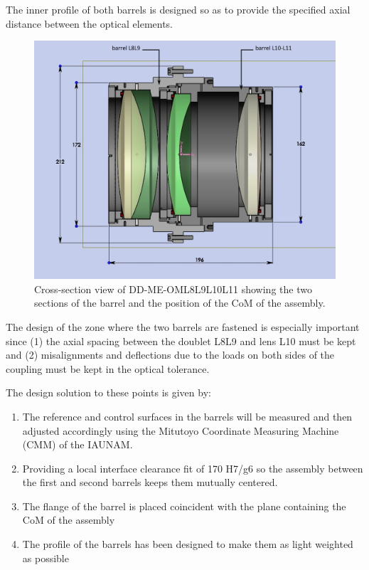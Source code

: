 \documentclass{report}
\begin{document}
The inner profile of both barrels is designed so as to provide the specified axial distance between the optical elements. 

\begin{figure}
\begin{center}
\includegraphics[width=0.7\linewidth]{figures/DD-OML8L9-L10L11.png}
\end{center}
\caption{Cross-section view of DD-ME-OML8L9L10L11 showing the two sections of the barrel and the position of the CoM of the assembly.}
\label{figure:WOB-L8L11-SV}
\end{figure}

The design of the zone where the two barrels are fastened is especially important since (1) the axial spacing between the doublet L8L9 and lens L10 must be kept and (2) misalignments and deflections due to the loads on both sides of the coupling must be kept in the optical tolerance.

The design solution to these points is given by:
\begin{enumerate}
\item The reference and control surfaces in the barrels will be measured and then adjusted accordingly using the Mitutoyo Coordinate Measuring Machine (CMM) of the IAUNAM. 
\item Providing a local interface clearance fit of 170 H7/g6 so the assembly between the first and second barrels keeps them mutually centered. 
\item The flange of the barrel is placed coincident with the plane containing the CoM of the assembly 
\item The profile of the barrels has been designed to make them as light weighted as possible
\end{enumerate}
\end{document}
